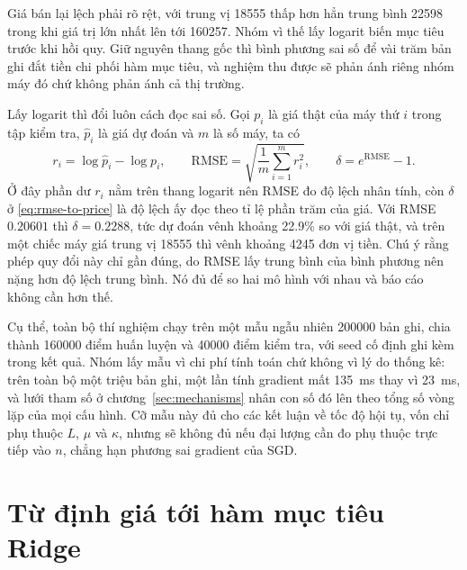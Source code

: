 Giá bán lại lệch phải rõ rệt, với trung vị \num{18555} thấp hơn hẳn trung bình
\num{22598} trong khi giá trị lớn nhất lên tới \num{160257}. Nhóm vì thế lấy
logarit biến mục tiêu trước khi hồi quy. Giữ nguyên thang gốc thì bình phương sai
số để vài trăm bản ghi đắt tiền chi phối hàm mục tiêu, và nghiệm thu được sẽ phản
ánh riêng nhóm máy đó chứ không phản ánh cả thị trường.

Lấy logarit thì đổi luôn cách đọc sai số. Gọi $p_i$ là giá thật của máy thứ $i$
trong tập kiểm tra, $\hat{p}_i$ là giá dự đoán và $m$ là số máy, ta có
%
\begin{equation}
  \label{eq:rmse-to-price}
  r_i = \log \hat{p}_i - \log p_i,
  \qquad
  \mathrm{RMSE} = \sqrt{\frac{1}{m} \sum_{i=1}^{m} r_i^{2}},
  \qquad
  \delta = e^{\mathrm{RMSE}} - 1 .
\end{equation}
%
Ở đây phần dư $r_i$ nằm trên thang logarit nên RMSE đo độ lệch nhân tính, còn
$\delta$ ở \eqref{eq:rmse-to-price} là độ lệch ấy đọc theo tỉ lệ phần trăm của
giá. Với RMSE $\num{0.20601}$ thì $\delta = \num{0.2288}$, tức dự đoán vênh khoảng
\num{22.9}\% so với giá thật,
và trên một chiếc máy giá trung vị \num{18555} thì vênh khoảng \num{4245} đơn vị
tiền. Chú ý rằng phép quy đổi này chỉ gần đúng, do RMSE lấy trung bình của bình
phương nên nặng hơn độ lệch trung bình. Nó đủ để so hai mô hình với nhau và báo
cáo không cần hơn thế.

Cụ thể, toàn bộ thí nghiệm chạy trên một mẫu ngẫu nhiên \num{200000} bản ghi,
chia thành \num{160000} điểm huấn luyện và \num{40000} điểm kiểm tra, với seed cố
định ghi kèm trong kết quả. Nhóm lấy mẫu vì chi phí tính toán chứ không vì lý do
thống kê: trên toàn bộ một triệu bản ghi, một lần tính gradient mất
\SI{135}{\milli\second} thay vì \SI{23}{\milli\second}, và lưới tham số ở
chương~\ref{sec:mechanisms} nhân con số đó lên theo tổng số vòng lặp của mọi cấu
hình. Cỡ mẫu này đủ cho các kết luận về tốc độ hội tụ, vốn chỉ phụ thuộc $L$,
$\mu$ và $\kappa$, nhưng sẽ không đủ nếu đại lượng cần đo phụ thuộc trực tiếp vào
$n$, chẳng hạn phương sai gradient của SGD.

\section{Từ định giá tới hàm mục tiêu Ridge}
\label{sec:objective}

